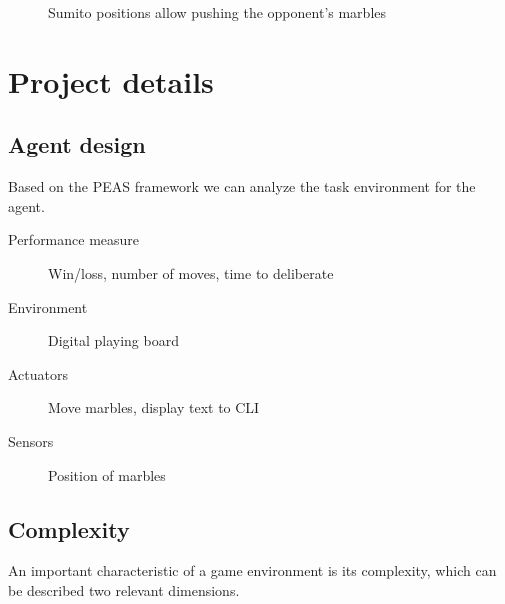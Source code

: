 \documentclass{llncs}
\begin{document}
\begin{figure}[!h]
  \centering
  \hfill
  \hfill
  \caption{Sumito positions allow pushing the opponent's marbles \cite{abalone_sa_abalone_nodate}}
  \label{sumito}
\end{figure}

\section{Project details}

\subsection{Agent design}

Based on the PEAS framework we can analyze the task environment for the agent. \cite[p.107]{russell_artificial_2021}

\begin{description}
  \item[Performance measure] Win/loss, number of moves, time to deliberate
  \item[Environment] Digital playing board
  \item[Actuators] Move marbles, display text to CLI
  \item[Sensors] Position of marbles
\end{description}

\subsection{Complexity}
An important characteristic of a game environment is its complexity, which can be described two relevant dimensions.
\end{document}
